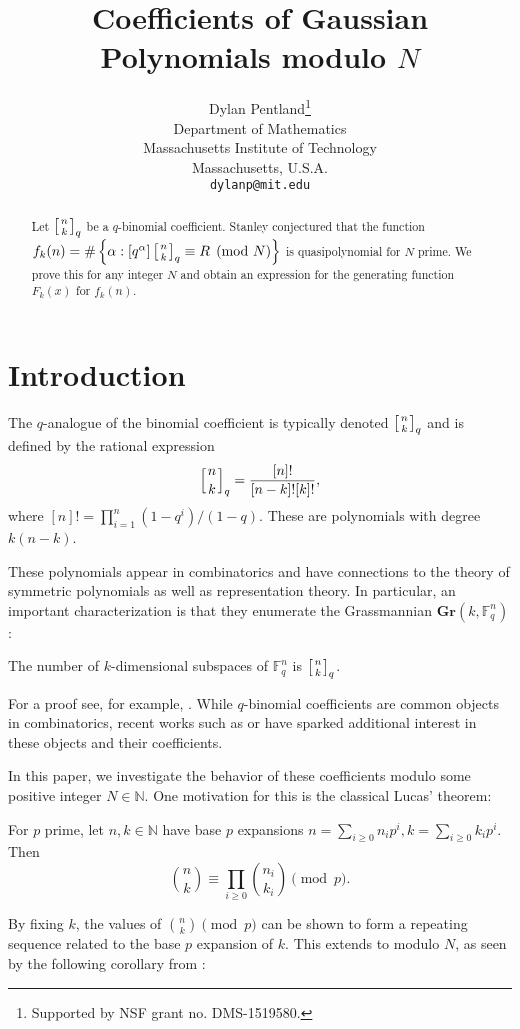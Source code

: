 \documentclass[12pt]{article}
\title{Coefficients of Gaussian Polynomials modulo $N$}
\author{Dylan Pentland\thanks{Supported by NSF grant no. DMS-1519580.}\\
\small Department of Mathematics\\[-0.8ex]
\small Massachusetts Institute of Technology\\[-0.8ex] 
\small Massachusetts, U.S.A.\\
\small\tt dylanp@mit.edu}
\newcommand{\N}{\mathbb{N}}
\newcommand{\F}{\mathbb{F}}
\newcommand{\qbinom}[2]{\left[{#1 \atop #2}\right]_q}
\begin{document}
\maketitle

\begin{abstract}
Let $\qbinom{n}{k}$ be a $q$-binomial coefficient. Stanley conjectured that the function $f_{k}(n) = \#\left\{\alpha : [q^{\alpha}] \left[{n \atop k}\right]_q  \equiv R \pmod{N}\right\}$ is quasipolynomial for $N$ prime. We prove this for any integer $N$ and obtain an expression for the generating function $F_{k}(x)$ for $f_{k}(n)$.
\end{abstract}

\section{Introduction}
The $q$-analogue of the binomial coefficient is typically denoted $\qbinom{n}{k}$ and is defined by the rational expression 
\[\qbinom{n}{k} = \frac{[n]!}{[n-k]![k]!},\]
where $[n]! = \prod_{i=1}^{n}{(1-q^i)/(1-q)}$. These are polynomials with degree $k(n-k)$.

These polynomials appear in combinatorics and have connections to the theory of symmetric polynomials as well as representation theory. In particular, an important characterization is that they enumerate the Grassmannian $\mathbf{Gr}(k , \F_q^n)$:

\begin{theorem}\label{11}
The number of $k$-dimensional subspaces of $\F_q^n$ is $\qbinom{n}{k}$.
\end{theorem}

\noindent For a proof see, for example, \cite{stanley}. While $q$-binomial coefficients are common objects in combinatorics, recent works such as \cite{kronecker} or \cite{stanley2} have sparked additional interest in these objects and their coefficients.

In this paper, we investigate the behavior of these coefficients modulo some positive integer $N\in \N$. One motivation for this is the classical Lucas' theorem:
\begin{theorem} For $p$ prime, let $n,k\in \N$ have base $p$ expansions $n = \sum_{i\ge 0}{n_i p^i}, k =\sum_{i\ge 0}{k_i p^i}$. Then
\[\binom{n}{k} \equiv \prod_{i\ge 0}{\binom{n_i}{k_i}} \pmod{p}.\]
\label{12}
\end{theorem}

\noindent By fixing $k$, the values of $\binom{n}{k} \pmod{p}$ can be shown to form a repeating sequence related to the base $p$ expansion of $k$. This extends to modulo $N$, as seen by the following corollary from \cite{kwongbinom}:
\end{document}
